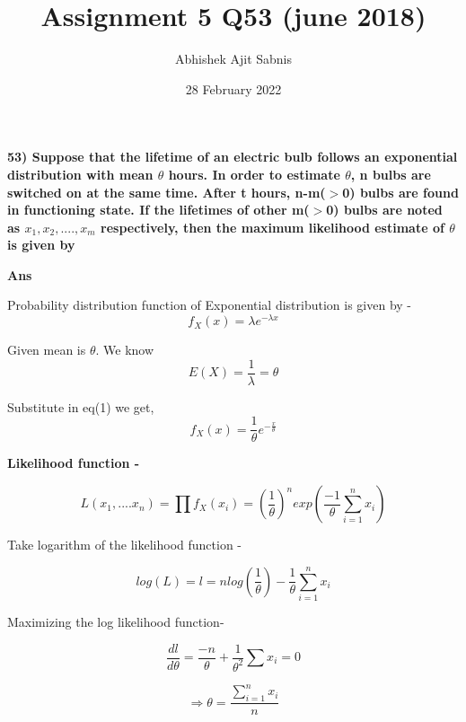 \documentclass{article}
\title{\textbf{Assignment 5 Q53 (june 2018)}}
\author{Abhishek Ajit Sabnis}
\date{28 February 2022}
\begin{document}
\maketitle

\textbf{53) Suppose that the lifetime of an electric bulb follows an exponential distribution with mean $\theta$ hours. In order to estimate $\theta$, n bulbs are switched on at the same time. After t hours, n-m($>$0) bulbs are found in functioning state. If the lifetimes of other m($>$0) bulbs are noted as $x_1, x_2,....,x_m$ respectively, then the maximum likelihood estimate of $\theta$ is given by  }

\vspace{0.5cm}

\textbf{Ans} 

Probability distribution function of Exponential distribution is given by - 
\begin{equation}
    f_X(x) = \lambda e^{-\lambda x}
\end{equation}

Given mean is $\theta$. We know
\begin{equation}
    E(X) = \frac{1}{\lambda} = \theta
\end{equation}

Substitute in eq(1) we get,
\begin{equation}
    f_X(x) = \frac{1}{\theta} e^{-\frac{x}{\theta}}
\end{equation}

\textbf{Likelihood function -}

\begin{equation}
    L(x_1,....x_n) = \prod f_X(x_i) = (\frac{1}{\theta})^n exp(\frac{-1}{\theta} \sum_{i=1}^{n} x_i)
\end{equation}

Take logarithm of the likelihood function - 

\begin{equation}
    log(L) = l = n log(\frac{1}{\theta}) - \frac{1}{\theta} \sum_{i=1}^{n} x_i
\end{equation}

Maximizing the log likelihood function- 

\begin{equation}
    \frac{dl}{d\theta} = \frac{-n}{\theta} + \frac{1}{\theta^2} \sum x_i =0
\end{equation}

\begin{equation}
    \Rightarrow \theta = \frac{\sum_{i=1}^{n} x_i}{n}
\end{equation}
\end{document}
